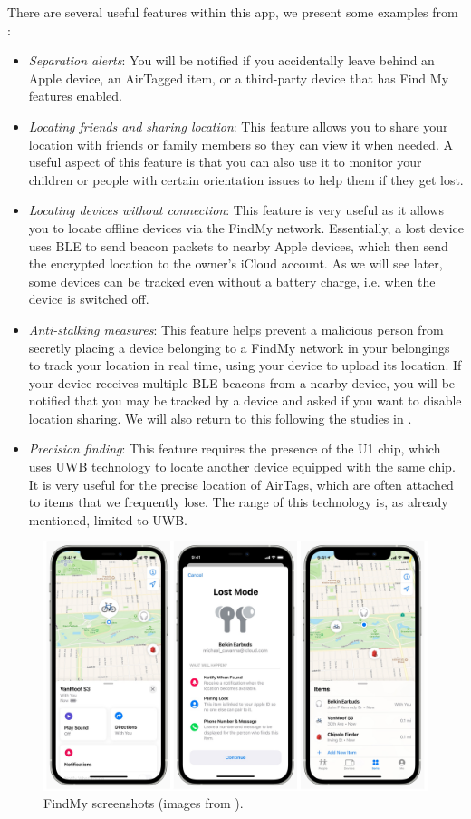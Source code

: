 \documentclass[english]{article}
\begin{document}
There are several useful features within this app, we present some examples from \cite{Clover_2022}:
\begin{itemize}
  \item \textit{Separation alerts}: You will be notified if you accidentally leave behind an Apple device, an AirTagged item, or a third-party device that has Find My features enabled.
  \item \textit{Locating friends and sharing location}: This feature allows you to share your location with friends or family members so they can view it when needed. A useful aspect of this feature is that you can also use it to monitor your children or people with certain orientation issues to help them if they get lost.
  \item \textit{Locating devices without connection}: This feature is very useful as it allows you to locate offline devices via the FindMy network. Essentially, a lost device uses BLE to send beacon packets to nearby Apple devices, which then send the encrypted location to the owner’s iCloud account. As we will see later, some devices can be tracked even without a battery charge, i.e. when the device is switched off.
  \item \textit{Anti-stalking measures}: This feature helps prevent a malicious person from secretly placing a device belonging to a FindMy network in your belongings to track your location in real time, using your device to upload its location. If your device receives multiple BLE beacons from a nearby device, you will be notified that you may be tracked by a device and asked if you want to disable location sharing. We will also return to this following the studies in \cite{airguard}.
  \item \textit{Precision finding}: This feature requires the presence of the U1 chip, which uses UWB technology to locate another device equipped with the same chip. It is very useful for the precise location of AirTags, which are often attached to items that we frequently lose. The range of this technology is, as already mentioned, limited to UWB.
\end{itemize}

\begin{figure}[t]
	\centering
	\includegraphics[width=.9\textwidth]{images/findmy.jpg}
	\caption{FindMy screenshots (images from \cite{findmyscreen}).}
	\label{findmy2}
\end{figure}
\end{document}
